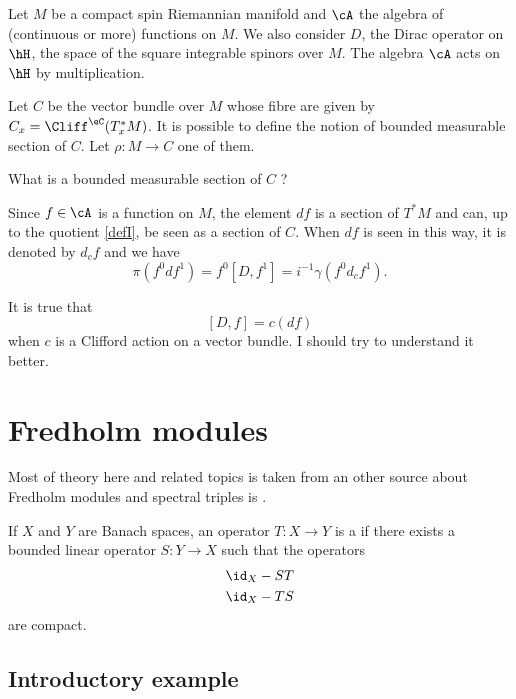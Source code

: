 Let $M$ be a compact spin Riemannian manifold and $\cA$ the algebra of (continuous or more) functions on $M$. We also consider $D$, the Dirac operator on $\hH$, the space of the square integrable spinors over $M$. The algebra $\cA$ acts on $\hH$ by multiplication.

Let $C$ be the vector bundle over $M$ whose fibre are given by $C_x=\Cliff^{\eC}(T^*_xM)$. It is possible to define the notion of bounded measurable section of $C$. Let $\rho\colon M\to C$ one of them.

\begin{probleme}
	What is a bounded measurable section of $C$ ?
\end{probleme}

Since $f\in\cA$ is a function on $M$, the element $df$ is a section of $T^*M$ and can, up to the quotient \eqref{defI}, be seen as a section of $C$. When $df$ is seen in this way, it is denoted by $d_cf$ and we have
\[ 
  \pi(f^0df^1)=f^0[D,f^1]=i^{-1}\gamma(f^0d_cf^1).
\]

\begin{probleme}
It is true that
\[ 
  [D,f]=c(df)
\]
when $c$ is a Clifford action on a vector bundle. I should try to understand it better.
\end{probleme}


\section{Fredholm modules}

Most of theory here and related topics is taken from \cite{ConnesNCG,Landi} an other source about Fredholm modules and spectral triples is \cite{Whittaker}. 

If $X$ and $Y$ are Banach spaces, an operator $T\colon X\to Y$ is a  if there exists a bounded linear operator $S\colon Y\to X$ such that the operators
\begin{subequations}
	\begin{align}
		\id_X-ST\\
		\id_X-TS
	\end{align}
\end{subequations}
are compact.

\subsection{Introductory example}

